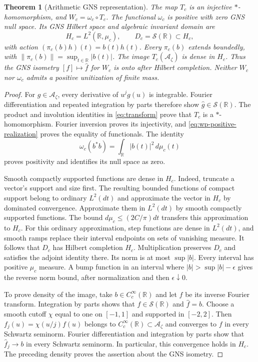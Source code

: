 \documentclass[11pt]{article}
\newtheorem{theorem}{Theorem}[section]
\theoremstyle{definition}
\theoremstyle{remark}
\numberwithin{equation}{section}
\newcommand{\cA}{\mathcal A}
\newcommand{\R}{\mathbb R}
\begin{document}
\begin{theorem}[Arithmetic GNS representation]
\label{thm:wp-carrier}
The map $T_c$ is an injective $*$-homomorphism, and
$W_c=\omega_c\circ T_c$.
The functional $\omega_c$ is positive with zero GNS null space.
Its GNS Hilbert space and algebraic invariant domain are
\[
 H_c=L^2(\R,\mu_c),\qquad D_c=\mathscr S(\R)\subset H_c,
\]
with action $(\pi_c(b)h)(t)=b(t)h(t)$.
Every $\pi_c(b)$ extends boundedly, with
$\|\pi_c(b)\|=\sup_{t\in\R}|b(t)|$.
The image $T_c(\cA_\zeta)$ is dense in $H_c$.
Thus the GNS isometry $[f]\mapsto\widehat f$ for $W_c$ is onto
after Hilbert completion.
Neither $W_c$ nor $\omega_c$ admits a positive unitization of finite mass.
\end{theorem}
\begin{proof}
For $g\in\cA_\zeta$, every derivative of $u^j g(u)$ is integrable.
Fourier differentiation and repeated integration by parts therefore show
$\widehat g\in\mathscr S(\R)$.
The product and involution identities in \eqref{eq:transform} prove
that $T_c$ is a $*$-homomorphism.
Fourier inversion proves its injectivity, and
\eqref{eq:wp-positive-realization} proves the equality of functionals.
The identity
\[
 \omega_c(b^*b)=\int_{\R}|b(t)|^2\,d\mu_c(t)
\]
proves positivity and identifies its null space as zero.

Smooth compactly supported functions are dense in $H_c$.
Indeed, truncate a vector's support and size first.
The resulting bounded functions of compact support belong to ordinary
$L^2(dt)$ and approximate the vector in $H_c$ by dominated convergence.
Approximate them in $L^2(dt)$ by smooth compactly supported functions.
The bound $d\mu_c\leq(2C/\pi)dt$ transfers this approximation to $H_c$.
For this ordinary approximation, step functions are dense in $L^2(dt)$,
and smooth ramps replace their interval endpoints on sets of vanishing measure.
It follows that $D_c$ has Hilbert completion $H_c$.
Multiplication preserves $D_c$ and satisfies the adjoint identity there.
Its norm is at most $\sup|b|$.
Every interval has positive $\mu_c$ measure.
A bump function in an interval where $|b|>\sup|b|-\epsilon$
gives the reverse norm bound, after normalization and then
$\epsilon\downarrow0$.

To prove density of the image, take $b\in C_c^\infty(\R)$ and
let $f$ be its inverse Fourier transform.
Integration by parts shows that $f\in\mathscr S(\R)$ and $\widehat f=b$.
Choose a smooth cutoff $\chi$ equal to one on $[-1,1]$ and supported
in $[-2,2]$.
Then $f_j(u)=\chi(u/j)f(u)$ belongs to $C_c^\infty(\R)\subset\cA_\zeta$
and converges to $f$ in every Schwartz seminorm.
Fourier differentiation and integration by parts show that
$\widehat f_j\to b$ in every Schwartz seminorm.
In particular, this convergence holds in $H_c$.
The preceding density proves the assertion about the GNS isometry.


\end{proof}
\end{document}
